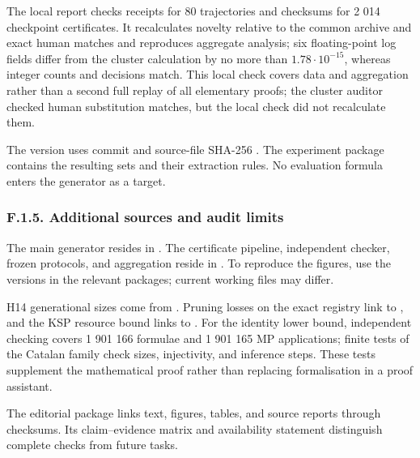 \documentclass[pdflatex,sn-basic,Numbered]{sn-jnl}
\begin{document}
The local report  checks receipts for 80 trajectories and checksums for 2 014 checkpoint certificates. It recalculates novelty relative to the common archive and exact human matches and reproduces aggregate analysis; six floating-point log fields differ from the cluster calculation by no more than \(1.78 \cdot 10^{- 15}\), whereas integer counts and decisions match. This local check covers data and aggregation rather than a second full replay of all elementary proofs; the cluster auditor checked human substitution matches, but the local check did not recalculate them.

The  version uses commit  and source-file SHA-256 . The experiment package contains the resulting sets and their extraction rules. No evaluation formula enters the generator as a target.

\subsubsection*{F.1.5. Additional sources and audit limits}\label{f.1.5.-additional-sources-and-audit-limits}

The main generator resides in . The certificate pipeline, independent checker, frozen protocols, and aggregation reside in . To reproduce the figures, use the versions in the relevant packages; current working files may differ.

H14 generational sizes come from . Pruning losses on the exact registry link to , and the KSP resource bound links to . For the identity lower bound, independent checking covers 1 901 166 formulae and 1 901 165 MP applications; finite tests of the Catalan family check sizes, injectivity, and inference steps. These tests supplement the mathematical proof rather than replacing formalisation in a proof assistant.

The editorial package links text, figures, tables, and source reports through checksums. Its claim--evidence matrix and availability statement distinguish complete checks from future tasks.
\end{document}
